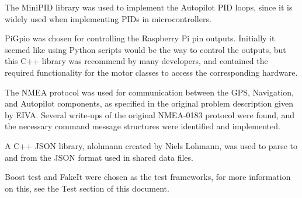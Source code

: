 The MiniPID library was used to implement the Autopilot PID loops, since it is widely used when implementing PIDs in microcontrollers.

PiGpio was chosen for controlling the Raspberry Pi pin outputs. Initially it seemed like using Python scripts would be the way to control the outputs, but this C++ library was recommend by many developers, and contained the required functionality for the motor classes to access the corresponding hardware.

The NMEA protocol was used for communication between the GPS, Navigation, and Autopilot components, as specified in the original problem description given by EIVA. Several write-ups of the original NMEA-0183 protocol were found, and the necessary command message structures were identified and implemented.

A C++ JSON library, nlohmann created by Niels Lohmann, was used to parse to and from the JSON format used in shared data files.

Boost test and FakeIt were chosen as the test frameworks, for more information on this, see the Test section of this document.